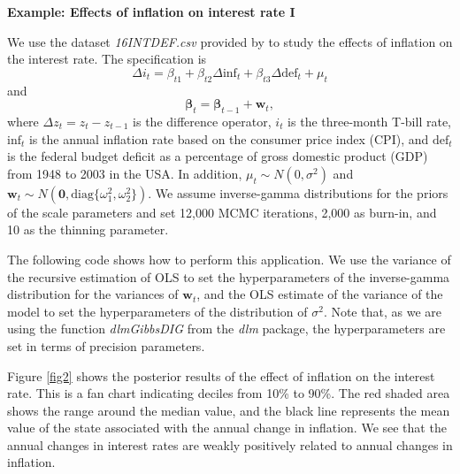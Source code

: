 \textbf{Example: Effects of inflation on interest rate I}

We use the dataset \textit{16INTDEF.csv} provided by \cite[Chaps.~10]{wooldridge2016introductory} to study the effects of inflation on the interest rate. The specification is 
\[
\Delta i_t = \beta_{t1} + \beta_{t2}\Delta \text{inf}_t + \beta_{t3}\Delta \text{def}_t + \mu_t
\]
and 
\[
\bm{\beta}_t = \bm{\beta}_{t-1} + \bm{w}_t,
\]
where $\Delta z_t = z_t - z_{t-1}$ is the difference operator, $i_t$ is the three-month T-bill rate, $\text{inf}_t$ is the annual inflation rate based on the consumer price index (CPI), and $\text{def}_t$ is the federal budget deficit as a percentage of gross domestic product (GDP) from 1948 to 2003 in the USA. In addition, $\mu_t \sim N(0, \sigma^2)$ and $\bm{w}_t \sim N(\bm{0}, \text{diag}\{\omega_1^2, \omega_2^2\})$. We assume inverse-gamma distributions for the priors of the scale parameters and set 12,000 MCMC iterations, 2,000 as burn-in, and 10 as the thinning parameter.

The following code shows how to perform this application. We use the variance of the recursive estimation of OLS to set the hyperparameters of the inverse-gamma distribution for the variances of $\bm{w}_t$, and the OLS estimate of the variance of the model to set the hyperparameters of the distribution of $\sigma^2$. Note that, as we are using the function \textit{dlmGibbsDIG} from the \textit{dlm} package, the hyperparameters are set in terms of precision parameters.

Figure \ref{fig2} shows the posterior results of the effect of inflation on the interest rate. This is a fan chart indicating deciles from 10\% to 90\%. The red shaded area shows the range around the median value, and the black line represents the mean value of the state associated with the annual change in inflation. We see that the annual changes in interest rates are weakly positively related to annual changes in inflation.

